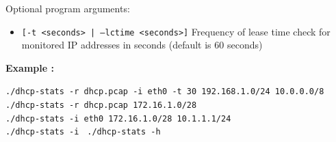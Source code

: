 \documentclass[a4paper, 11pt, a4paper]{article}
\begin{document}
\bigskip

\noindent Optional program arguments:

\begin{itemize}
    \item \texttt{[-t <seconds> | ---lctime <seconds>]} Frequency of lease time check for monitored IP addresses in seconds (default is 60 seconds)
\end{itemize}



\noindent\Large{\textbf{Example :}}

\noindent\texttt{\small./dhcp-stats -r dhcp.pcap -i eth0 -t 30 192.168.1.0/24 10.0.0.0/8\normalsize}\\
\noindent\texttt{\small./dhcp-stats -r dhcp.pcap 172.16.1.0/28 \normalsize}\\
\noindent\texttt{\small./dhcp-stats -i eth0 172.16.1.0/28 10.1.1.1/24\normalsize}\\
\noindent\texttt{\small./dhcp-stats -i \normalsize}
\noindent\texttt{\small./dhcp-stats -h \normalsize}

\noindent


\newpage


\renewcommand{\refname}{Literature}

\end{document}
